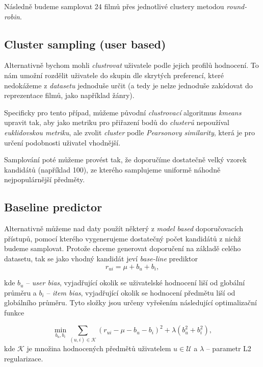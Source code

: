 \documentclass[12pt,a4paper]{report}
\begin{document}
Následně budeme samplovat 24 filmů přes jednotlivé clustery
metodou \textit{round-robin}.

\subsection{Cluster sampling (user based)}
Alternativně bychom mohli \textit{clustrovat}
uživatele podle jejich profilů hodnocení.
To nám umožní rozdělit uživatele
do skupin dle skrytých preferencí, které
nedokážeme z \textit{datasetu} jednoduše
určit (a tedy je nelze jednoduše
zakódovat do reprezentace filmů,
jako například žánry).

Specificky pro tento případ,
můžeme původní \textit{clustrovací}
algoritmus \textit{kmeans} upravit
tak, aby jako metriku pro přiřazení
bodů do \textit{clusterů} nepoužíval \textit{euklidovskou metriku},
ale zvolit \textit{cluster} podle \textit{Pearsonovy similarity},
která je pro určení podobnosti uživatel vhodnější.

Samplování poté můžeme provést tak, že doporučíme dostatečně
velký vzorek kandidátů (například 100), ze kterého
samplujeme uniformě náhodně nejpopulárnější
předměty.







\subsection{Baseline predictor}
Alternativně můžeme nad daty použít některý z
\textit{model based} doporučovacích přístupů,
pomocí kterého vygenerujeme dostatečný počet kandidátů
z nichž budeme samplovat. Protože chceme generovat
doporučení na základě celého datasetu, tak se jako vhodný
kandidát jeví \textit{base-line} prediktor
$$
    \hat{r}_{ui} = \mu + b_u + b_i,
$$

kde $b_u$ -- \textit{user bias}, vyjadřující okolik se uživatelské hodnocení liší od globální průměru
a $b_i$ -- \textit{item bias}, vyjadřující okolik se hodnocení předmětu liší od globálního průměru.
Tyto složky jsou určeny vyřešením následující optimalizační funkce

$$
\min_{b_u, b_i} \sum_{(u,i) \in \mathcal{K}} (r_{ui} - \mu - b_u - b_i)^2 + \lambda(b_u^2 + b_i^2),
$$
kde $\mathcal{K}$ je množina hodnocených předmětů uživatelem $u \in \mathcal{U}$ a $\lambda$ -- parametr L2 regularizace.
\end{document}
